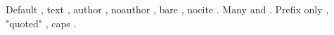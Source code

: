 Default \citep{knuth84}, text \citet{doe-2020}, author ,
noauthor \citeyearpar[see][p. 3]{doe-2020}, bare \citeyear{zed}, nocite \nocite{lower}.
Many \citep[before][after]{knuth84,doe-2020} and .
Prefix only \citep[see][]{zed}, "quoted" \citep{knuth84}, caps .



